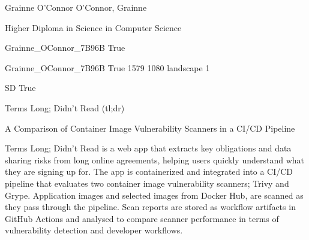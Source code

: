 \documentclass[twoside]{report}
\begin{document}
\begingroup{}\relax



\def\Key{Grainne_OConnor_7B96B}

{Grainne O'Connor}
{O'Connor, Grainne}

{Higher Diploma in Science in Computer Science}

{Grainne_OConnor_7B96B}
{True}

{Grainne_OConnor_7B96B}
{True}
{1579}
{1080}
{landscape}
{1}

{SD}
{True}

{Terms Long; Didn't Read (tl;dr)}

{A Comparison of Container Image Vulnerability Scanners in a CI/CD Pipeline}

{Terms Long; Didn't Read is a web app that extracts key obligations and data sharing risks from long online agreements, helping users quickly understand what they are signing up for. The app is containerized and integrated into a CI/CD pipeline that evaluates two container image vulnerability scanners; Trivy and Grype. 
Application images and selected images from Docker Hub, are scanned as they pass through the pipeline. Scan reports are stored as workflow artifacts in GitHub Actions and analysed to compare scanner performance in terms of vulnerability detection and developer workflows.}
\end{document}
